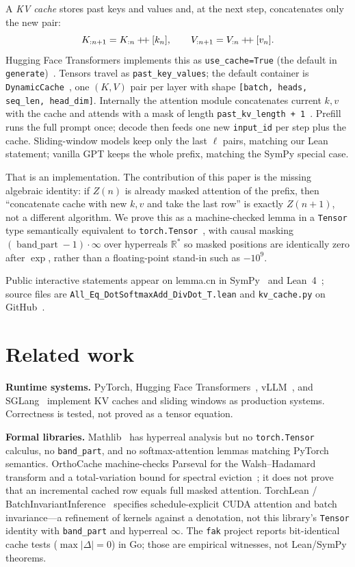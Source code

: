 \documentclass[11pt,a4paper]{article}
\newcommand{\bandpart}{\operatorname{band\_part}}
\newcommand{\concat}{\mathbin{+\mkern-4mu+}}
\newcommand{\Rstar}{\mathbb{R}^*}
\begin{document}
A \emph{KV cache} stores past keys and values and, at the next step, concatenates only the new pair:
\[
K_{:n+1}=K_{:n}\concat[k_n],\qquad V_{:n+1}=V_{:n}\concat[v_n].
\]
Hugging Face Transformers implements this as \texttt{use\_cache=True} (the default in \texttt{generate})~\cite{huggingface_generate}.
Tensors travel as \texttt{past\_key\_values}; the default container is \texttt{DynamicCache}~\cite{huggingface_dynamic_cache}, one $(K,V)$ pair per layer with shape \texttt{[batch, heads, seq\_len, head\_dim]}.
Internally the attention module concatenates current $k,v$ with the cache and attends with a mask of length \texttt{past\_kv\_length + 1}~\cite{huggingface_kv_cache}.
Prefill runs the full prompt once; decode then feeds one new \texttt{input\_id} per step plus the cache.
Sliding-window models keep only the last $\ell$ pairs, matching our Lean statement; vanilla GPT keeps the whole prefix, matching the SymPy special case.

That is an implementation.
The contribution of this paper is the missing algebraic identity: if $Z(n)$ is already masked attention of the prefix, then ``concatenate cache with new $k,v$ and take the last row'' is exactly $Z(n{+}1)$, not a different algorithm.
We prove this as a machine-checked lemma in a \texttt{Tensor} type semantically equivalent to \texttt{torch.Tensor}~\cite{lemma_repo}, with causal masking $(\bandpart-1)\cdot\infty$ over hyperreals $\Rstar$ so masked positions are identically zero after $\exp$, rather than a floating-point stand-in such as $-10^9$.

Public interactive statements appear on lemma.cn in SymPy~\cite{lemma_kv_cache_sympy} and Lean~4~\cite{lemma_kv_cache_lean}; source files are
\texttt{All\_Eq\_DotSoftmaxAdd\_DivDot\_T.lean} and \texttt{kv\_cache.py} on GitHub~\cite{lemma_repo}.

\section{Related work}
\label{sec:related}

\textbf{Runtime systems.}
PyTorch, Hugging Face Transformers~\cite{huggingface_kv_cache}, vLLM~\cite{vllm}, and SGLang~\cite{sglang} implement KV caches and sliding windows as production systems.
Correctness is tested, not proved as a tensor equation.

\textbf{Formal libraries.}
Mathlib~\cite{mathlib_hyperreal} has hyperreal analysis but no \texttt{torch.Tensor} calculus, no \texttt{band\_part}, and no softmax-attention lemmas matching PyTorch semantics.
OrthoCache machine-checks Parseval for the Walsh--Hadamard transform and a total-variation bound for spectral eviction~\cite{orthocache}; it does not prove that an incremental cached row equals full masked attention.
TorchLean / BatchInvariantInference~\cite{torchlean} specifies schedule-explicit CUDA attention and batch invariance---a refinement of kernels against a denotation, not this library's \texttt{Tensor} identity with \texttt{band\_part} and hyperreal $\infty$.
The \texttt{fak} project reports bit-identical cache tests ($\max|\Delta|=0$) in Go; those are empirical witnesses, not Lean/SymPy theorems.
\end{document}
